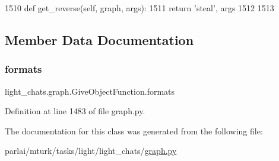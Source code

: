 \begin{DoxyCode}
1510     \textcolor{keyword}{def }get\_reverse(self, graph, args):
1511         \textcolor{keywordflow}{return} \textcolor{stringliteral}{'steal'}, args
1512 
1513 
\end{DoxyCode}


\subsection{Member Data Documentation}
\mbox{\label{classlight__chats_1_1graph_1_1GiveObjectFunction_a0fec6f9aa2b89ddc4ab44917d13eaaf6}} 
\subsubsection{\texorpdfstring{formats}{formats}}
{\footnotesize\ttfamily light\+\_\+chats.\+graph.\+Give\+Object\+Function.\+formats}



Definition at line 1483 of file graph.\+py.



The documentation for this class was generated from the following file\+:\begin{DoxyCompactItemize}
\item 
parlai/mturk/tasks/light/light\+\_\+chats/\hyperlink{parlai_2mturk_2tasks_2light_2light__chats_2graph_8py}{graph.\+py}\end{DoxyCompactItemize}
